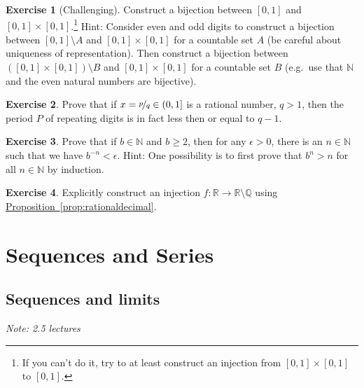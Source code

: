 \documentclass[12pt]{book}
\newcommand{\R}{{\mathbb{R}}}
\newcommand{\N}{{\mathbb{N}}}
\newcommand{\Q}{{\mathbb{Q}}}
\newcommand{\sectionnotes}[1]{\noindent \emph{Note: #1} \medskip \par}
\theoremstyle{plain}
\theoremstyle{remark}
\theoremstyle{definition}
\theoremstyle{exercise}
\newtheorem{exercise}{Exercise}[section]
\theoremstyle{example}
\newcommand{\propref}[1]{\hyperref[#1]{Proposition~\ref*{#1}}}
\begin{document}
\begin{exercise}[Challenging]
Construct a bijection between $[0,1]$ and $[0,1] \times [0,1]$.\footnote{%
If you can't do it, try to at least construct an injection from
$[0,1] \times [0,1]$ to
$[0,1]$.}
Hint:
Consider even and odd digits to construct a bijection between 
$[0,1] \setminus A$ and $[0,1] \times [0,1]$ for a countable set $A$ (be
careful about uniqueness of representation).
Then construct a bijection between $([0,1] \times [0,1]) \setminus B$
and $[0,1] \times [0,1]$ for a countable set $B$ (e.g.\ use 
that $\N$ and the even natural numbers are bijective).
\end{exercise}

\begin{exercise}
Prove that if $x = \nicefrac{p}{q} \in (0,1]$ is a rational number, $q > 1$,
then the period $P$ of repeating digits is in fact less then or equal to $q-1$.
\end{exercise}

\begin{exercise} \label{exercise:bnlimit}
Prove that if $b \in \N$ and $b \geq 2$, then for any $\epsilon > 0$,
there is an $n \in \N$ such that 
we have $b^{-n} < \epsilon$.  Hint:
One possibility is to first prove that $b^n > n$ for all $n \in \N$ by induction.
\end{exercise}

\begin{exercise}
Explicitly construct an injection $f \colon \R \to \R \setminus \Q$ using
\propref{prop:rationaldecimal}.
\end{exercise}



\chapter{Sequences and Series} \label{seq:chapter}


\section{Sequences and limits}
\label{sec:seqsandlims}

\sectionnotes{2.5 lectures}
\end{document}
